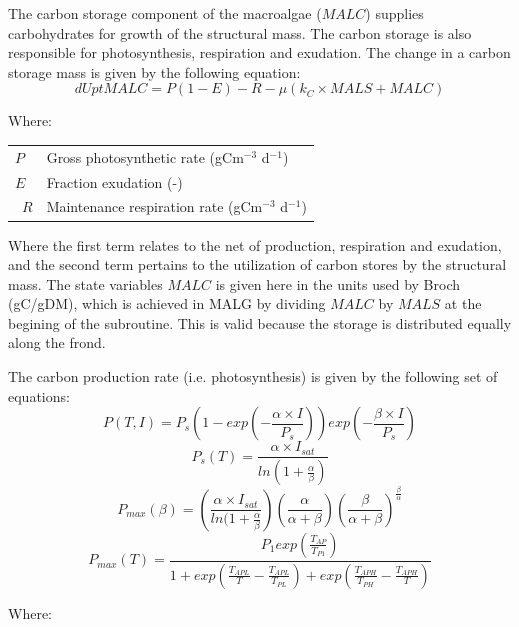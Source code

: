 \documentclass{deltares_manual}
\begin{document}
The carbon storage component of the macroalgae ($MALC$) supplies carbohydrates for growth of the structural mass. The carbon storage is also responsible for photosynthesis, respiration and exudation. The change in a carbon storage mass is given by the following equation:
\begin{equation}
dUptMALC = P(1-E)-R - \mu(k_C \times MALS + MALC)
\end{equation}

Where:\\

\begin{tabular}{ll}
$P$ & Gross photosynthetic rate (gCm$^{-3}$ d$^{-1}$)\\
$E$ & Fraction exudation (-)\\\
$R$ & Maintenance respiration rate (gCm$^{-3}$ d$^{-1}$)\\
\end{tabular}

Where the first term relates to the net of production, respiration and exudation, and the second term pertains to the utilization of carbon stores by the structural mass. The state variables $MALC$ is given here in the units used by Broch (gC/gDM), which is achieved in MALG by dividing $MALC$ by $MALS$ at the begining of the subroutine. This is valid because the storage is distributed equally along the frond.

The carbon production rate (i.e. photosynthesis) is given by the following set of equations:
\begin{equation}
P(T,I) = P_s(1-exp(-\frac{\alpha \times I}{P_s}))exp(-\frac{\beta \times I}{P_s})
\end{equation}
\begin{equation}
P_s(T) = \frac{\alpha \times I_{sat}}{ln(1+\frac{\alpha}{\beta})}
\end{equation}
\begin{equation}
P_{max}(\beta) = (\frac{\alpha \times I_{sat}}{ln(1+\frac{\alpha}{\beta}})(\frac{\alpha}{\alpha+\beta})(\frac{\beta}{\alpha+\beta})^{\frac{\beta}{\alpha}}
\end{equation}
\begin{equation}
P_{max}(T) = \frac{P_1exp(\frac{T_{AP}}{T_{P1}})}{1+exp(\frac{T_{APL}}{T} - \frac{T_{APL}}{T_{PL}})+exp(\frac{T_{APH}}{T_{PH}}-\frac{T_{APH}}{T})}
\end{equation}

Where:\\
\end{document}

